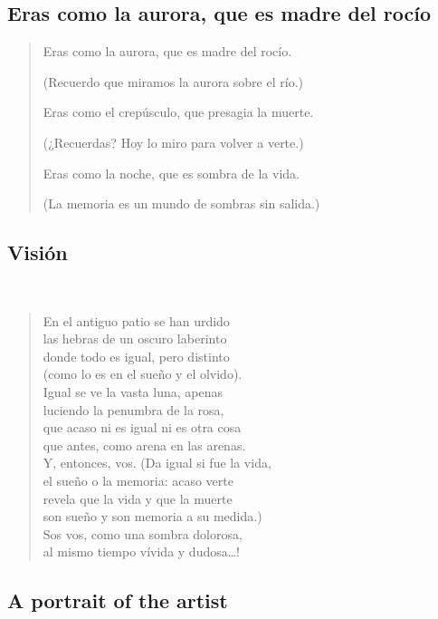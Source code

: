 \documentclass[a4paper, 12pt]{article}
\begin{document}
\pagebreak

\subsection{Eras como la aurora, que es madre del rocío}

\begin{verse}
    Eras como la aurora,
    que es madre del rocío.

    (Recuerdo que miramos
    la aurora sobre el río.)

    Eras como el crepúsculo,
    que presagia la muerte.

    (¿Recuerdas? Hoy lo miro 
    para volver a verte.)

    Eras como la noche,
    que es sombra de la vida.

    (La memoria es un mundo 
    de sombras sin salida.)
\end{verse}

\pagebreak
\subsection{Visión}
~ 

\begin{verse}
    
En el antiguo patio se han urdido\\
las hebras de un oscuro laberinto\\
donde todo es igual, pero distinto\\
(como lo es en el sueño y el olvido).\\
Igual se ve la vasta luna, apenas\\
luciendo la penumbra de la rosa,\\
que acaso ni es igual ni es otra cosa\\
que antes, como arena en las arenas.\\
Y, entonces, vos. (Da igual si fue la vida,\\
el sueño o la memoria: acaso verte\\
revela que la vida y que la muerte\\
son sueño y son memoria a su medida.)\\
Sos vos, como una sombra dolorosa,\\
al mismo tiempo vívida y dudosa…!\\
\end{verse}

\pagebreak
\subsection{A portrait of the artist}
~ 
\end{document}
